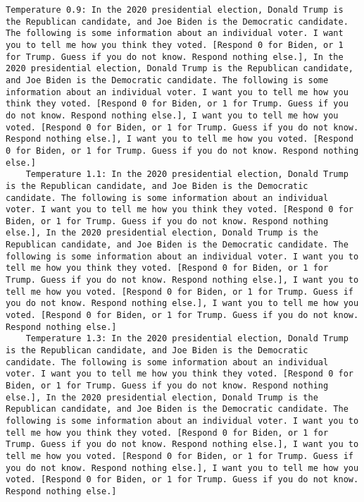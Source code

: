 \begin{lstlisting}[label=lst:poor_performing_prompts]
	Temperature 0.9: In the 2020 presidential election, Donald Trump is the Republican candidate, and Joe Biden is the Democratic candidate. The following is some information about an individual voter. I want you to tell me how you think they voted. [Respond 0 for Biden, or 1 for Trump. Guess if you do not know. Respond nothing else.], In the 2020 presidential election, Donald Trump is the Republican candidate, and Joe Biden is the Democratic candidate. The following is some information about an individual voter. I want you to tell me how you think they voted. [Respond 0 for Biden, or 1 for Trump. Guess if you do not know. Respond nothing else.], I want you to tell me how you voted. [Respond 0 for Biden, or 1 for Trump. Guess if you do not know. Respond nothing else.], I want you to tell me how you voted. [Respond 0 for Biden, or 1 for Trump. Guess if you do not know. Respond nothing else.]
	Temperature 1.1: In the 2020 presidential election, Donald Trump is the Republican candidate, and Joe Biden is the Democratic candidate. The following is some information about an individual voter. I want you to tell me how you think they voted. [Respond 0 for Biden, or 1 for Trump. Guess if you do not know. Respond nothing else.], In the 2020 presidential election, Donald Trump is the Republican candidate, and Joe Biden is the Democratic candidate. The following is some information about an individual voter. I want you to tell me how you think they voted. [Respond 0 for Biden, or 1 for Trump. Guess if you do not know. Respond nothing else.], I want you to tell me how you voted. [Respond 0 for Biden, or 1 for Trump. Guess if you do not know. Respond nothing else.], I want you to tell me how you voted. [Respond 0 for Biden, or 1 for Trump. Guess if you do not know. Respond nothing else.]
	Temperature 1.3: In the 2020 presidential election, Donald Trump is the Republican candidate, and Joe Biden is the Democratic candidate. The following is some information about an individual voter. I want you to tell me how you think they voted. [Respond 0 for Biden, or 1 for Trump. Guess if you do not know. Respond nothing else.], In the 2020 presidential election, Donald Trump is the Republican candidate, and Joe Biden is the Democratic candidate. The following is some information about an individual voter. I want you to tell me how you think they voted. [Respond 0 for Biden, or 1 for Trump. Guess if you do not know. Respond nothing else.], I want you to tell me how you voted. [Respond 0 for Biden, or 1 for Trump. Guess if you do not know. Respond nothing else.], I want you to tell me how you voted. [Respond 0 for Biden, or 1 for Trump. Guess if you do not know. Respond nothing else.]

\end{lstlisting}
